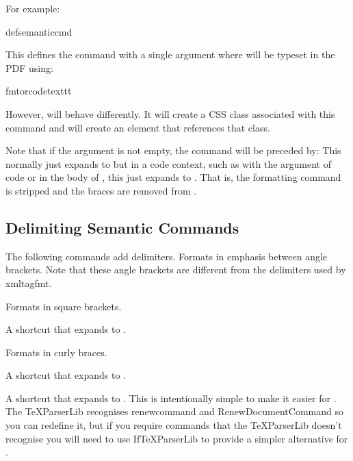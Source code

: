 \documentclass[toc=listof]{scrreport}
\begin{document}
For example:
\begin{codebox*}
\gls{defsemanticcmd}
\end{codebox*}
This defines the command  with a single argument
where  will be typeset in the PDF
using:
\begin{compactcodebox}
\gls{fmtorcode}\gls{texttt}
\end{compactcodebox}
However,  will behave differently. It will create
a CSS class associated with this command and  will
create an element that references that class.

Note that if the  argument is not empty, the
 command will be preceded by:
This normally just expands to  but in a
code context, such as with the argument of \gls{code} or in the body
of , this just expands to . That is, the
formatting command  is stripped and the braces are removed
from .

\subsection{Delimiting Semantic Commands}
\label{sec:delimsemanticcmds}

The following commands add delimiters.
Formats  in emphasis between angle brackets.
Note that these angle brackets are different from the delimiters
used by \gls{xmltagfmt}.

Formats  in square brackets.

A shortcut that expands to
.

Formats  in curly braces.

A shortcut that expands to
.

A shortcut that expands to
.
This is intentionally simple to make it easier for
. The \gls{TeXParserLib} recognises
\gls{renewcommand} and \gls{RenewDocumentCommand} so you can
redefine it, but if you require commands that 
the \gls{TeXParserLib} doesn't recognise you will need to use
\gls{IfTeXParserLib} to provide a simpler alternative for
.
\end{document}
